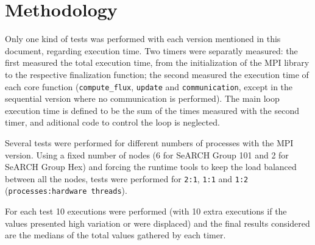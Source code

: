 \section{Methodology}
\label{sec:methodology}

Only one kind of tests was performed with each version mentioned in this document, regarding execution time. Two timers were separatly measured: the first measured the total execution time, from the initialization of the MPI library to the respective finalization function; the second measured the execution time of each core function (\texttt{compute\_flux}, \texttt{update} and \texttt{communication}, except in the sequential version where no communication is performed). The main loop execution time is defined to be the sum of the times measured with the second timer, and aditional code to control the loop is neglected.

Several tests were performed for different numbers of processes with the MPI version. Using a fixed number of nodes (6 for SeARCH Group 101 and 2 for SeARCH Group Hex) and forcing the runtime tools to keep the load balanced between all the nodes, tests were performed for \texttt{2:1}, \texttt{1:1} and \texttt{1:2} (\texttt{processes:hardware threads}).

For each test 10 executions were performed (with 10 extra executions if the values presented high variation or were displaced) and the final results considered are the medians of the total values gathered by each timer.